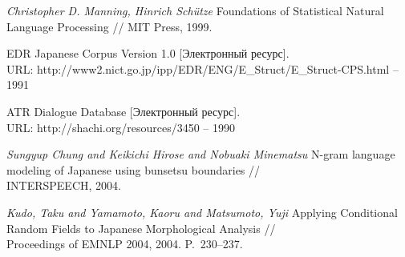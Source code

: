 \begin{thebibliography}{00}
\textit{Christopher D. Manning, Hinrich Schütze} Foundations of Statistical Natural Language Processing //
MIT Press, 1999.

 EDR Japanese Corpus Version 1.0 [Электронный ресурс]. \\ URL: http://www2.nict.go.jp/ipp/EDR/ENG/E\_Struct/E\_Struct-CPS.html -- 1991

 ATR Dialogue Database [Электронный ресурс]. \\ URL: http://shachi.org/resources/3450 -- 1990

\textit{Sungyup Chung and Keikichi Hirose and Nobuaki Minematsu} N-gram language modeling of Japanese using bunsetsu boundaries //\\
INTERSPEECH, 2004.

\textit{Kudo, Taku and Yamamoto, Kaoru and Matsumoto, Yuji} Applying Conditional Random Fields to Japanese Morphological Analysis //\\
Proceedings of EMNLP 2004, 2004. P.~230--237.


\end{thebibliography}
